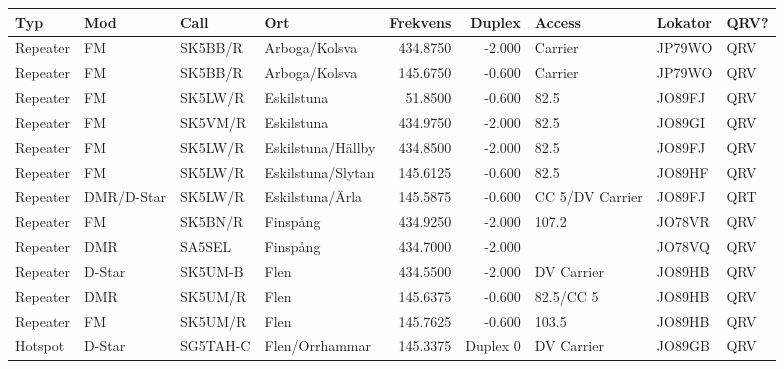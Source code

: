 \begin{landscape}
\begin{longtable}{llllrrlll}
	\bf Typ           & \bf Mod    & \bf Call & \bf Ort              & \bf Frekvens & \bf Duplex & \bf Access        & \bf Lokator & \bf QRV? \\ \hline
	\endhead
Repeater & FM         & SK5BB/R  & Arboga/Kolsva        &     434.8750 &     -2.000 & Carrier           & JP79WO      & QRV      \\
	Repeater          & FM         & SK5BB/R  & Arboga/Kolsva        &     145.6750 &     -0.600 & Carrier           & JP79WO      & QRV      \\
	Repeater          & FM         & SK5LW/R  & Eskilstuna           &      51.8500 &     -0.600 & 82.5              & JO89FJ      & QRV      \\
	Repeater          & FM         & SK5VM/R  & Eskilstuna           &     434.9750 &     -2.000 & 82.5              & JO89GI      & QRV      \\
	Repeater          & FM         & SK5LW/R  & Eskilstuna/Hällby    &     434.8500 &     -2.000 & 82.5              & JO89FJ      & QRV      \\
	Repeater          & FM         & SK5LW/R  & Eskilstuna/Slytan    &     145.6125 &     -0.600 & 82.5              & JO89HF      & QRV      \\
	Repeater          & DMR/D-Star & SK5LW/R  & Eskilstuna/Ärla      &     145.5875 &     -0.600 & CC 5/DV Carrier   & JO89FJ      & QRT      \\
	Repeater          & FM         & SK5BN/R  & Finspång             &     434.9250 &     -2.000 & 107.2             & JO78VR      & QRV      \\
	Repeater          & DMR        & SA5SEL   & Finspång             &     434.7000 &     -2.000 &                   & JO78VQ      & QRV      \\
	Repeater          & D-Star     & SK5UM-B  & Flen                 &     434.5500 &     -2.000 & DV Carrier        & JO89HB      & QRV      \\
	Repeater          & DMR        & SK5UM/R  & Flen                 &     145.6375 &     -0.600 & 82.5/CC 5         & JO89HB      & QRV      \\
	Repeater          & FM         & SK5UM/R  & Flen                 &     145.7625 &     -0.600 & 103.5             & JO89HB      & QRV      \\
	Hotspot           & D-Star     & SG5TAH-C & Flen/Orrhammar       &     145.3375 &   Duplex 0 & DV Carrier        & JO89GB      & QRV      \\

\end{longtable}
\end{landscape}
